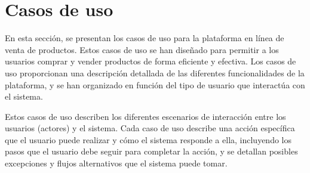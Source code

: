 
\section{Casos de uso}\label{sec:casos-uso}
En esta sección, se presentan los casos de uso para la plataforma en línea de venta de productos. Estos casos de uso se han diseñado para permitir a los usuarios comprar y vender productos de forma eficiente y efectiva. Los casos de uso proporcionan una descripción detallada de las diferentes funcionalidades de la plataforma, y se han organizado en función del tipo de usuario que interactúa con el sistema.

Estos casos de uso describen los diferentes escenarios de interacción entre los usuarios (actores) y el sistema. Cada caso de uso describe una acción específica que el usuario puede realizar y cómo el sistema responde a ella, incluyendo los pasos que el usuario debe seguir para completar la acción, y se detallan posibles excepciones y flujos alternativos que el sistema puede tomar.

